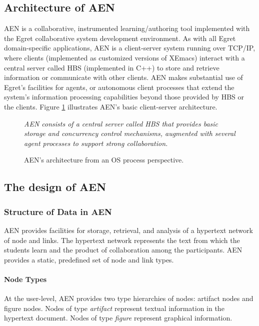 \subsection{Architecture of AEN}
\label{sec:architectureAEN}

AEN is a collaborative, instrumented learning/authoring tool implemented
with the Egret collaborative system development
environment\cite{csdl-93-09}.  As with all Egret domain-specific
applications, AEN is a client-server system running over TCP/IP, where
clients (implemented as customized versions of XEmacs) interact with a
central server called HBS (implemented in C++) to store and retrieve
information or communicate with other clients.  AEN makes substantial use
of Egret's facilities for agents, or autonomous client processes that
extend the system's information processing capabilities beyond those
provided by HBS or the clients.  Figure \ref{fig:aen-architecture}
illustrates AEN's basic client-server architecture.

\begin{figure}[htb]
  \centerline{} 
  {\em AEN consists of a central server called HBS that provides basic
  storage and concurrency control mechanisms, augmented with several agent
  processes to support strong collaboration.}
 \caption{AEN's architecture from an OS process perspective.}
\label{fig:aen-architecture}
\end{figure}

\subsection{The design of AEN}
\label{sec:designAEN}
\subsubsection{Structure of Data in AEN}

AEN provides facilities for storage, retrieval, and analysis of a hypertext
network of node and links. The hypertext network represents the text from
which the students learn and the product of collaboration among the
participants.  AEN provides a static, predefined set of node and link
types.

\paragraph{Node Types}

At the user-level, AEN provides two type hierarchies of nodes: artifact
nodes and figure nodes.  Nodes of type {\em artifact} represent textual
information in the hypertext document.  Nodes of type {\em figure}
represent graphical information.

